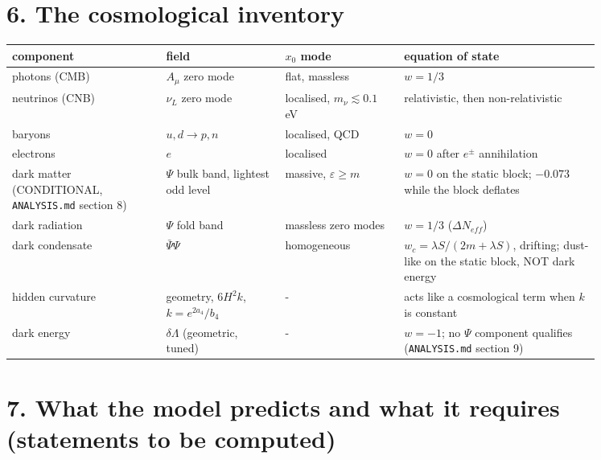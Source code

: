 \documentclass[11pt]{article}
\begin{document}
\section*{6. The cosmological inventory}

\begin{longtable}{>{\raggedright\arraybackslash}p{0.221\linewidth}>{\raggedright\arraybackslash}p{0.179\linewidth}>{\raggedright\arraybackslash}p{0.170\linewidth}>{\raggedright\arraybackslash}p{0.281\linewidth}}
\toprule
\textbf{component} & \textbf{field} & \textbf{$x_0$ mode} & \textbf{equation of state} \\
\midrule
photons (CMB) & $A_\mu$ zero mode & flat, massless & $w = 1/3$ \\
neutrinos (CNB) & $\nu_L$ zero mode & localised, $m_\nu \lesssim 0.1$ eV & relativistic, then non-relativistic \\
baryons & $u, d \to p, n$ & localised, QCD & $w = 0$ \\
electrons & $e$ & localised & $w = 0$ after $e^\pm$ annihilation \\
dark matter (CONDITIONAL, \texttt{ANALYSIS.\allowbreak{}md} section 8) & $\Psi$ bulk band, lightest odd level & massive, $\varepsilon \geq m$ & $w = 0$ on the static block; $-0.073$ while the block deflates \\
dark radiation & $\Psi$ fold band & massless zero modes & $w = 1/3$ ($\Delta N_{eff}$) \\
dark condensate & $\bar\Psi\Psi$ & homogeneous & $w_c = \lambda S/(2m + \lambda S)$, drifting; dust-like on the static block, NOT dark energy \\
hidden curvature & geometry, $6H^2 k$, $k = e^{2a_4}/b_4$ & - & acts like a cosmological term when $k$ is constant \\
dark energy & $\delta\Lambda$ (geometric, tuned) & - & $w = -1$; no $\Psi$ component qualifies (\texttt{ANALYSIS.\allowbreak{}md} section 9) \\
\bottomrule
\end{longtable}

\section*{7. What the model predicts and what it requires (statements to be computed)}
\end{document}
